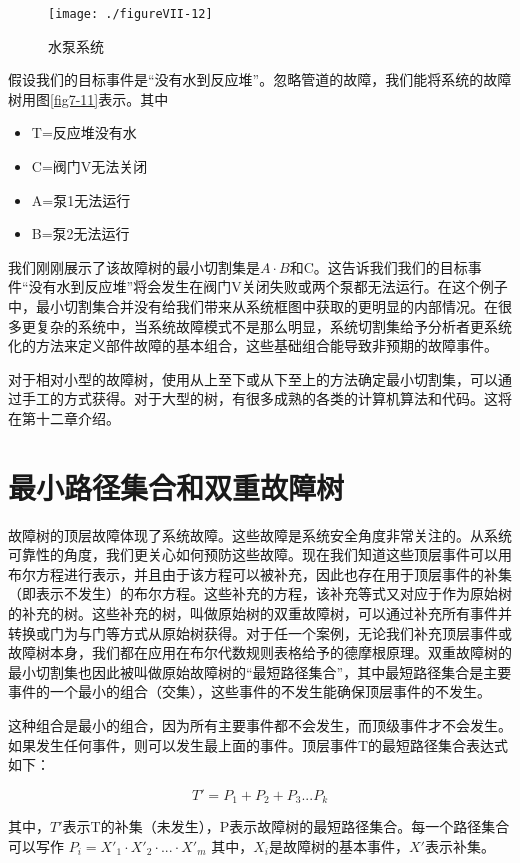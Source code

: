 \documentclass[cn,11pt,chinese]{elegantbook}
\begin{document}
{\begin{figure}[H]
	\centering
	\texttt{[image: ./figureVII-12]}
	\caption{水泵系统}
	\label{fig7-12}
\end{figure}


假设我们的目标事件是“没有水到反应堆”。忽略管道的故障，我们能将系统的故障树用图\ref{fig7-11}表示。其中

\begin{itemize}
	\item T=反应堆没有水
\item C=阀门V无法关闭
\item A=泵1无法运行
\item B=泵2无法运行
\end{itemize}


我们刚刚展示了该故障树的最小切割集是$A\cdot B$和C。这告诉我们我们的目标事件“没有水到反应堆”将会发生在阀门V关闭失败或两个泵都无法运行。在这个例子中，最小切割集合并没有给我们带来从系统框图中获取的更明显的内部情况。在很多更复杂的系统中，当系统故障模式不是那么明显，系统切割集给予分析者更系统化的方法来定义部件故障的基本组合，这些基础组合能导致非预期的故障事件。

对于相对小型的故障树，使用从上至下或从下至上的方法确定最小切割集，可以通过手工的方式获得。对于大型的树，有很多成熟的各类的计算机算法和代码。这将在第十二章介绍。


\section{最小路径集合和双重故障树}

故障树的顶层故障体现了系统故障。这些故障是系统安全角度非常关注的。从系统可靠性的角度，我们更关心如何预防这些故障。现在我们知道这些顶层事件可以用布尔方程进行表示，并且由于该方程可以被补充，因此也存在用于顶层事件的补集（即表示不发生）的布尔方程。这些补充的方程，该补充等式又对应于作为原始树的补充的树。这些补充的树，叫做原始树的双重故障树，可以通过补充所有事件并转换或门为与门等方式从原始树获得。对于任一个案例，无论我们补充顶层事件或故障树本身，我们都在应用在布尔代数规则表格给予的德摩根原理。双重故障树的最小切割集也因此被叫做原始故障树的“最短路径集合”，其中最短路径集合是主要事件的一个最小的组合（交集），这些事件的不发生能确保顶层事件的不发生。

这种组合是最小的组合，因为所有主要事件都不会发生，而顶级事件才不会发生。如果发生任何事件，则可以发生最上面的事件。顶层事件T的最短路径集合表达式如下：

$$T'=P_1+P_2+P_3...P_k$$

其中，$T'$表示T的补集（未发生），P表示故障树的最短路径集合。每一个路径集合可以写作
$P_i=X'_1\cdot X'_2 \cdot ...\cdot X'_m$
其中，$X_i$是故障树的基本事件，$X'$表示补集。

}
\end{document}
